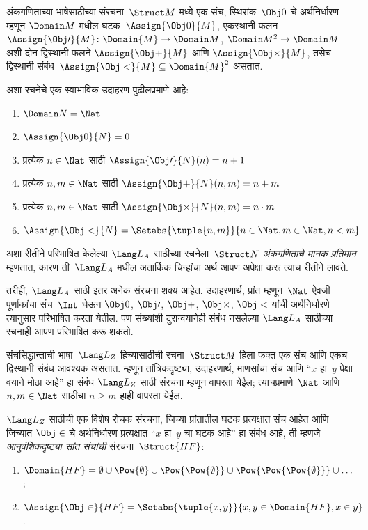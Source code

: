 \begin{ex}
अंकगणिताच्या भाषेसाठीच्या संरचना~$\Struct M$ मध्ये एक संच,
स्थिरांक~$\Obj 0$ चे अर्थनिर्धारण म्हणून $\Domain M$ मधील
घटक~$\Assign{\Obj 0}{M}$, एकस्थानी फलन
$\Assign{\Obj \prime}{M} \colon \Domain{M} \to \Domain M$,
$\Domain M^2 \to \Domain M$ अशी दोन द्विस्थानी फलने
$\Assign{\Obj +}{M}$ आणि $\Assign{\Obj \times}{M}$, तसेच द्विस्थानी
संबंध~$\Assign{\Obj <}{M} \subseteq \Domain{M}^2$ असतात.

अशा रचनेचे एक स्वाभाविक उदाहरण पुढीलप्रमाणे आहे:
\begin{enumerate}
\item $\Domain N = \Nat$
\item $\Assign{\Obj 0}{N} = 0$
\item प्रत्येक $n \in \Nat$ साठी $\Assign{\Obj \prime}{N}(n) = n + 1$
\item प्रत्येक $n, m \in \Nat$ साठी $\Assign{\Obj +}{N}(n, m) = n + m$
\item प्रत्येक $n, m \in \Nat$ साठी $\Assign{\Obj \times}{N}(n, m) = n\cdot m$
\item $\Assign{\Obj <}{N} = \Setabs{\tuple{n, m}}{n \in \Nat, m \in
  \Nat, n < m}$
\end{enumerate}
अशा रीतीने परिभाषित केलेल्या $\Lang L_A$ साठीच्या रचनेला~$\Struct N$
\emph{अंकगणिताचे मानक प्रतिमान} म्हणतात, कारण ती~$\Lang L_A$ मधील
अतार्किक चिन्हांचा अर्थ आपण अपेक्षा करू त्याच रीतीने लावते.

तरीही, $\Lang L_A$ साठी इतर अनेक संरचना शक्य आहेत. उदाहरणार्थ,
प्रांत म्हणून~$\Nat$ ऐवजी पूर्णांकांचा संच~$\Int$ घेऊन $\Obj 0$,
$\Obj \prime$, $\Obj +$, $\Obj \times$, $\Obj <$ यांची अर्थनिर्धारणे
त्यानुसार परिभाषित करता येतील. पण संख्यांशी दुरान्वयानेही संबंध नसलेल्या
$\Lang L_A$ साठीच्या रचनाही आपण परिभाषित करू शकतो.
\end{ex}

\begin{ex}
संचसिद्धान्ताची भाषा~$\Lang L_Z$ हिच्यासाठीची रचना~$\Struct M$ हिला
फक्त एक संच आणि एकच द्विस्थानी संबंध आवश्यक असतात. म्हणून तांत्रिकदृष्ट्या,
उदाहरणार्थ, माणसांचा संच आणि ``$x$ हा~$y$ पेक्षा वयाने मोठा आहे'' हा संबंध
$\Lang L_Z$ साठी संरचना म्हणून वापरता येईल; त्याचप्रमाणे~$\Nat$
आणि $n, m \in \Nat$ साठीचा $n \ge m$ हाही वापरता येईल.


$\Lang L_Z$ साठीची एक विशेष रोचक संरचना, जिच्या प्रांतातील
घटक प्रत्यक्षात संच आहेत आणि जिच्यात $\Obj \in$ चे अर्थनिर्धारण
प्रत्यक्षात ``$x$ हा~$y$ चा घटक आहे'' हा संबंध आहे, ती म्हणजे
\emph{आनुवंशिकदृष्ट्या सांत संचांची} संरचना~$\Struct{{HF}}$:
\begin{enumerate}
\item $\Domain{{{HF}}} = \emptyset \cup \Pow{\emptyset} \cup
  \Pow{\Pow{\emptyset}} \cup \Pow{\Pow{\Pow{\emptyset}}} \cup \dots$;
\item $\Assign{\Obj \in}{{{HF}}} = \Setabs{\tuple{x, y}}{x, y \in
  \Domain{{{HF}}}, x \in y}$.
\end{enumerate}
\end{ex}

